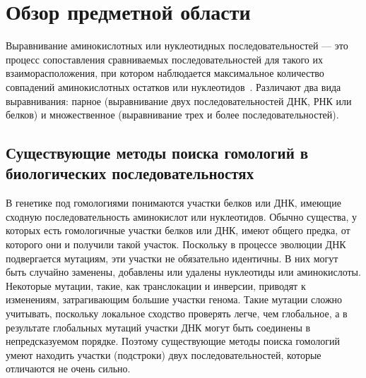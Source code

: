 \newpage

\section[Обзор предметной области]{\large \centering Обзор предметной области}
\hspace{\parindent} Выравнивание аминокислотных или нуклеотидных последовательностей --- это процесс сопоставления сравниваемых последовательностей для такого их взаиморасположения, при котором наблюдается максимальное количество совпадений аминокислотных остатков или нуклеотидов~\cite{AlignmentClustal}. Различают два вида выравнивания: парное (выравнивание двух последовательностей ДНК, РНК или белков) и множественное (выравнивание трех и более последовательностей). 

\subsection[Существующие методы поиска гомологий в биологических последовательностях]{\large Существующие методы поиска гомологий в биологических последовательностях}
\hspace{\parindent} В генетике под гомологиями понимаются участки белков или ДНК, имеющие сходную последовательность аминокислот или нуклеотидов. Обычно существа, у которых есть гомологичные участки белков или ДНК, имеют общего предка, от которого они и получили такой участок. Поскольку в процессе эволюции ДНК подвергается мутациям, эти участки не обязательно идентичны. В них могут быть случайно заменены, добавлены или удалены нуклеотиды или аминокислоты. Некоторые мутации, такие, как транслокации и инверсии, приводят к изменениям, затрагивающим большие участки генома. Такие мутации сложно учитывать, поскольку локальное сходство проверять легче, чем глобальное, а в результате глобальных мутаций участки ДНК могут быть соединены в непредсказуемом порядке. Поэтому существующие методы поиска гомологий умеют находить участки (подстроки) двух последовательностей, которые отличаются не очень сильно.

